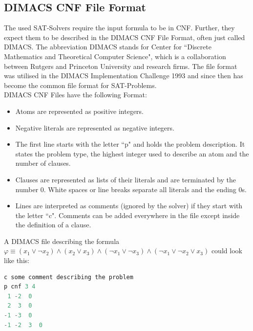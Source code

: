 \subsection{DIMACS CNF File Format}\label{DIMACS}
The used SAT-Solvers require the input formula to be in CNF. Further, they expect them to be described in the DIMACS CNF File Format, often just called DIMACS. The abbreviation DIMACS stands for Center for ``Discrete Mathematics and Theoretical Computer Science", which is a collaboration between Rutgers and Princeton University and research firms. The file format was utilised in the DIMACS Implementation Challenge 1993 and since then has become the common file format for SAT-Problems.\\

DIMACS CNF Files have the following Format:
\begin{itemize}
    \item Atoms are represented as positive integers.
    \item Negative literals are represented as negative integers.
    \item The first line starts with the letter ``p" and holds the problem description. It states the problem type, the highest integer used to describe an atom and the number of clauses.
    \item Clauses are represented as lists of their literals and are terminated by the number 0. White spaces or line breaks separate all literals and the ending 0s.
    \item Lines are interpreted as comments (ignored by the solver) if they start with the letter ``c". Comments can be added everywhere in the file except inside the definition of a clause.
\end{itemize}
A DIMACS file describing the formula $\varphi \equiv (x_1 \lor \neg x_2) \land (x_2 \lor x_3) \land (\neg x_1 \lor \neg x_3) \land (\neg x_1 \lor \neg x_2 \lor x_3)$ could look like this:

\lstset{basicstyle=\ttfamily}
\begin{lstlisting}[language=Java,frame=single]
c some comment describing the problem
p cnf 3 4
 1 -2  0
 2  3  0
-1 -3  0
-1 -2  3  0
\end{lstlisting}



